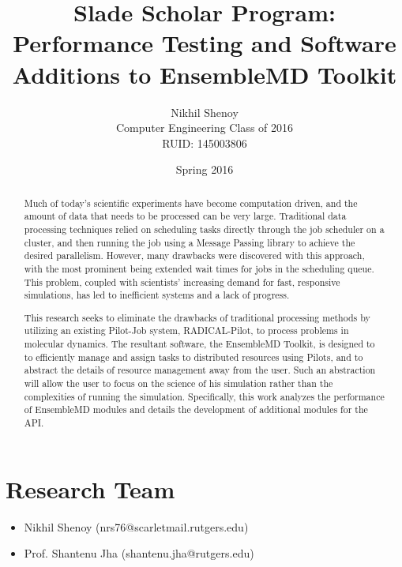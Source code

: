\documentclass{article}
\begin{document}
\title{Slade Scholar Program: Performance Testing and Software Additions to EnsembleMD Toolkit}
\author{Nikhil Shenoy\\
		Computer Engineering Class of 2016\\
		RUID: 145003806}
\date{Spring 2016}
\maketitle

\begin{abstract}
Much of today's scientific experiments have become computation driven, and the amount of data that needs to be processed can be very large. Traditional data processing techniques relied on scheduling tasks directly through the job scheduler on a cluster, and then running the job using a Message Passing library to achieve the desired parallelism. However, many drawbacks were discovered with this approach, with the most prominent being extended wait times for jobs in the scheduling queue. This problem, coupled with scientists' increasing demand for fast, responsive simulations, has led to inefficient systems and a lack of progress. 

This research seeks to eliminate the drawbacks of traditional processing methods by utilizing an existing Pilot-Job system, RADICAL-Pilot, to process problems in molecular dynamics. The resultant software, the EnsembleMD Toolkit, is designed to to efficiently manage and assign tasks to distributed resources using Pilots, and to abstract the details of resource management away from the user. Such an abstraction will allow the user to focus on the science of his simulation rather than the complexities of running the simulation. Specifically, this work analyzes the performance of EnsembleMD modules and details the development of additional modules for the API.
\end{abstract}

\section*{Research Team}
\begin{itemize}
	\item Nikhil Shenoy (nrs76@scarletmail.rutgers.edu)
	\item Prof. Shantenu Jha (shantenu.jha@rutgers.edu)
\end{itemize}
\end{document}
